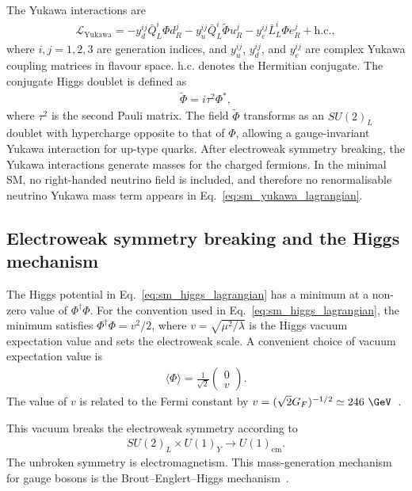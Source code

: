 The Yukawa interactions are
\begin{align}
    \mathcal{L}_{\mathrm{Yukawa}}
    =
    -
    y_{d}^{ij}\bar{Q}_{L}^{i}\Phi d_{R}^{j}
    -
    y_{u}^{ij}\bar{Q}_{L}^{i}\tilde{\Phi} u_{R}^{j}
    -
    y_{e}^{ij}\bar{L}_{L}^{i}\Phi e_{R}^{j}
    +
    \mathrm{h.c.},
    \label{eq:sm_yukawa_lagrangian}
\end{align}
where $i,j=1,2,3$ are generation indices, and $y_{u}^{ij}$, $y_{d}^{ij}$, and $y_{e}^{ij}$ are complex Yukawa coupling matrices in flavour space. 
$\mathrm{h.c.}$ denotes the Hermitian conjugate. 
The conjugate Higgs doublet is defined as
\begin{align}
    \tilde{\Phi}
    =
    i\tau^{2}\Phi^{*},
    \label{eq:higgs_conjugate_doublet}
\end{align}
where $\tau^{2}$ is the second Pauli matrix. 
The field $\tilde{\Phi}$ transforms as an $SU(2)_{L}$ doublet with hypercharge opposite to that of $\Phi$, allowing a gauge-invariant Yukawa interaction for up-type quarks. 
After electroweak symmetry breaking, the Yukawa interactions generate masses for the charged fermions. 
In the minimal SM, no right-handed neutrino field is included, and therefore no renormalisable neutrino Yukawa mass term appears in Eq.~\eqref{eq:sm_yukawa_lagrangian}.

\subsection{Electroweak symmetry breaking and the Higgs mechanism}
\label{subsec:ewsb}

The Higgs potential in Eq.~\eqref{eq:sm_higgs_lagrangian} has a minimum at a non-zero value of $\Phi^{\dagger}\Phi$. 
For the convention used in Eq.~\eqref{eq:sm_higgs_lagrangian}, the minimum satisfies $\Phi^{\dagger}\Phi=v^{2}/2$, where $v=\sqrt{\mu^{2}/\lambda}$ is the Higgs vacuum expectation value and sets the electroweak scale. 
A convenient choice of vacuum expectation value is
\begin{align}
    \langle\Phi\rangle
    =
    \frac{1}{\sqrt{2}}
    \begin{pmatrix}
        0 \\
        v
    \end{pmatrix}.
    \label{eq:higgs_vev}
\end{align}
The value of $v$ is related to the Fermi constant by $v=(\sqrt{2}G_{F})^{-1/2}\simeq 246~\GeV$~\cite{PDG2025}.

This vacuum breaks the electroweak symmetry according to
\begin{align}
    SU(2)_{L}\times U(1)_{Y}
    \rightarrow
    U(1)_{\mathrm{em}}.
    \label{eq:ewsb_breaking_pattern}
\end{align}
The unbroken symmetry is electromagnetism. 
This mass-generation mechanism for gauge bosons is the Brout--Englert--Higgs mechanism~\cite{Englert1964,Higgs1964,Guralnik1964}.

